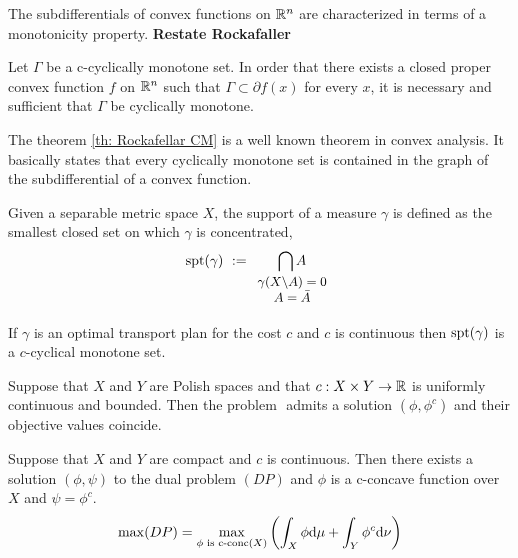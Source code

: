 
The subdifferentials  of convex functions on $\mathbb{R}^n$ are characterized in terms of a monotonicity property. \textbf{Restate Rockafaller}

\begin{theorem}[Rockafellar]
	\label{th: Rockafellar CM}
	Let $\Gamma$ be a c-cyclically monotone set. In order that there exists a closed proper convex function $f$ on $\mathbb{R}^n$ such that $\Gamma \subset \partial f(x) $ for  every $x$, it is necessary and sufficient that $\Gamma$ be cyclically monotone. 
\end{theorem}

The theorem \ref{th: Rockafellar CM} is a well known theorem in convex analysis. It basically states that every cyclically monotone set is contained in the graph of the subdifferential of a convex function.


\begin{definition}
	Given a separable metric space $X$, the support of a measure $\gamma$ is defined as the smallest closed set on which $\gamma$ is concentrated,
	\begin{equation}
	\spt(\gamma)\ :=\underset{\small{\begin{array}{c}
			\gamma(X\backslash A)=0\\ A=\bar{A}  \end{array}}}{\bigcap A} 		
	\end{equation} 
\end{definition}


\begin{theorem}
	If $\gamma$ is an optimal transport plan for the cost $c$ and $c$ is continuous then $\mathrm{spt}(\gamma)$ is a $c$-cyclical monotone set.
\end{theorem}

\begin{theorem}
	Suppose that $X$ and $Y$ are Polish spaces and that $c:X\times Y \rightarrow \mathbb{R}$ is uniformly continuous and bounded. Then the problem $ $ admits a solution $(\phi, \phi^c)$ and their objective values coincide. 
\end{theorem}

\begin{theorem}
	Suppose that $X$ and $Y$ are compact and $c$ is continuous. Then there exists a solution $(\phi, \psi)$ to the dual problem $(DP)$ and $\phi$ is a c-concave function over $X$ and $\psi=\phi^c$. 
	\begin{equation}
		\max (DP)= \max_{\phi\text{ is c-conc}(X)}\left(  \int_{X}\phi\mathrm{d}\mu +\int_{Y}\phi^c\mathrm{d}\nu \right)
	\end{equation} 
\end{theorem}


